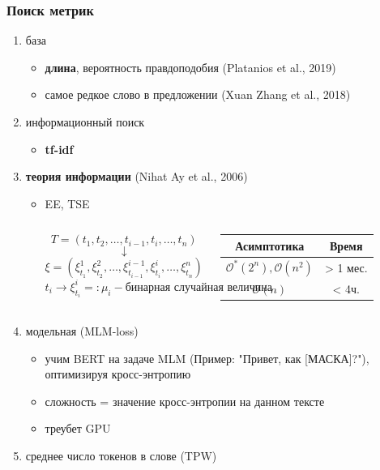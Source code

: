 \documentclass{beamer}
\begin{document}
\begin{frame}
	\frametitle{Поиск метрик}
	\begin{enumerate}
		\item  база
		\begin{itemize}
			\item {\bf длина}, вероятность правдоподобия (Platanios et al., 2019)
			\item самое редкое слово в предложении (Xuan Zhang et al., 2018)
		\end{itemize}
		\item информационный поиск
		\begin{itemize}
			\item {\bf tf-idf}
		\end{itemize}
		\item {\bf теория информации} (Nihat Ay et al., 2006)
		\begin{itemize}
			\item EE, TSE
				\begin{columns}
					\[
					T=(t_1, t_2, \ldots, t_{i-1},t_i,\ldots, t_n)
					\]
					\[
					\downarrow
					\]
					\[
					\xi=(\xi^1_{t_1},\xi^2_{t_2},\ldots,\xi^{i-1}_{t_{i-1}},\xi^i_{t_i},\ldots,\xi^n_{t_n})
					\]
					\[
					t_i\rightarrow \xi^i_{t_i} =: \mu_i - \text{бинарная случайная величина}
					\]
					\begin{table}
					\begin{tabular}{|c|c|}
					\hline
					Асимптотика & Время \\
					\hline
					$\mathcal{O^*}(2^n), \mathcal{O}(n^2)$ & > 1 мес. \\
					\hline
					$\mathcal{O}(n)$ & < 4ч. \\
					\hline
					\end{tabular}
					\end{table}
				\end{columns}
		\end{itemize}
		\item модельная (MLM-loss)
		\begin{itemize}
			\item
			учим BERT на задаче MLM (Пример: "Привет, как [МАСКА]?"), оптимизируя кросс-энтропию
			\item сложность = значение кросс-энтропии на данном тексте
			\item треубет GPU
		\end{itemize}
		\item среднее число токенов в слове (TPW)
	\end{enumerate}
\end{frame}
\end{document}
